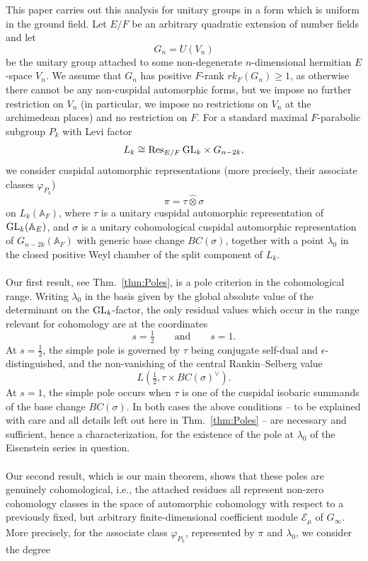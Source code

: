 \documentclass[a4paper,10pt]{amsart}
\theoremstyle{definition}
\numberwithin{equation}{section}
\def\EE{\mathcal E}
\def\GL{{\rm GL}}
\begin{document}
This paper carries out this analysis for unitary groups in a form which is
uniform in the ground field. Let \(E/F\) be an arbitrary quadratic
extension of number fields and let
$$
        G_n=U(V_n)
$$
be the unitary group attached to some non-degenerate $n$-dimensional  hermitian \(E\)-space
\(V_n\). We assume that \(G_n\) has positive \(F\)-rank $rk_F(G_n)\geq 1$, as otherwise there cannot be any non-cuspidal automorphic forms, but we impose no further
restriction on $V_n$ (in particular, we impose no restrictions on $V_n$ at the archimedean places) and no restriction
on \(F\). For a standard maximal \(F\)-parabolic subgroup \(P_k\) with
Levi factor
$$
        L_k\cong \operatorname{Res}_{E/F}\GL_k\times G_{n-2k},
$$
we consider cuspidal automorphic representations (more precisely, their associate classes $\varphi_{P_k}$)
$$
        \pi=\tau\widehat\otimes\sigma
$$
on \(L_k(\mathbb A_F)\), where \(\tau\) is a unitary cuspidal automorphic
representation of \(\GL_k(\mathbb A_E)\), and \(\sigma\) is a unitary
cohomological cuspidal automorphic representation of
\(G_{n-2k}(\mathbb A_F)\) with generic base change $BC(\sigma)$, together with a point $\lambda_0$ in the closed positive Weyl chamber of the split component of $L_k$. 
\\\\
Our first result, see Thm.\ \ref{thm:Poles}, is a pole criterion in the cohomological range. Writing $\lambda_0$ in the basis given by the global absolute value of the determinant on the $\GL_k$-factor, the only residual values which occur in the range relevant for cohomology are at the coordinates
$$
        s=\tfrac12
        \qquad\text{and}\qquad
        s=1 .
$$
At \(s=\frac12\), the simple pole is governed by $\tau$ being conjugate self-dual and \(\epsilon\)-distinguished, and the non-vanishing of the central
Rankin--Selberg value
$$
        L\!\left(\tfrac12,\tau\times BC(\sigma)^\vee\right).
$$
At \(s=1\), the simple pole occurs when \(\tau\) is one of the
cuspidal isobaric summands of the base change \(BC(\sigma)\). In both cases the above conditions -- to be explained with care and all details left out here in Thm.\ \ref{thm:Poles} -- are necessary and sufficient, hence a characterization, for the existence of the pole at $\lambda_0$ of the Eisenstein series in question.\\\\
Our second result, which is our main theorem, shows that these poles are genuinely cohomological, i.e., the attached residues all represent non-zero cohomology classes in the space of automorphic cohomology with respect to a previously fixed, but arbitrary finite-dimensional coefficient module $\EE_\mu$ of $G_\infty$. More precisely, for the associate class $\varphi_{P_k}$, represented by $\pi$ and $\lambda_0$, we consider the degree
\end{document}
